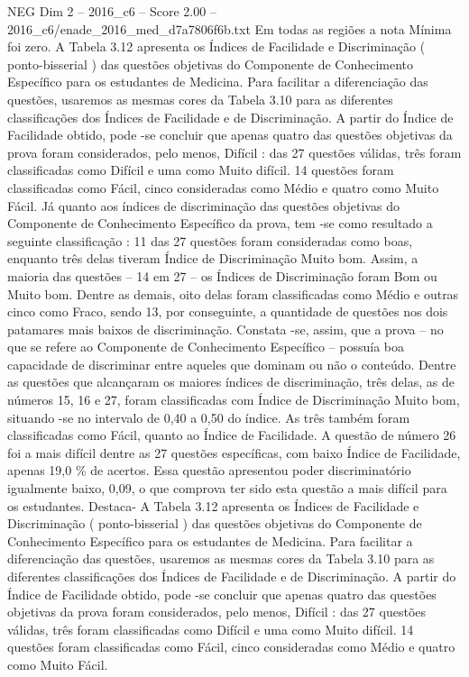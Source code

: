 \begin{textsample}{NEG Dim 2 – 2016\_c6 – Score 2.00 – 2016\_c6/enade\_2016\_med\_d7a7806f6b.txt}
Em todas as regiões a nota Mínima foi zero.
A Tabela 3.12 apresenta os Índices de Facilidade e Discriminação ( ponto-bisserial ) das questões objetivas do Componente de Conhecimento Específico para os estudantes de Medicina.
Para facilitar a diferenciação das questões, usaremos as mesmas cores da Tabela 3.10 para as diferentes classificações dos Índices de Facilidade e de Discriminação.
A partir do Índice de Facilidade obtido, pode -se concluir que apenas quatro das questões objetivas da prova foram considerados, pelo menos, Difícil : das 27 questões válidas, três foram classificadas como Difícil e uma como Muito difícil. 14 questões foram classificadas como Fácil, cinco consideradas como Médio e quatro como Muito Fácil.
Já quanto aos índices de discriminação das questões objetivas do Componente de Conhecimento Específico da prova, tem -se como resultado a seguinte classificação : 11 das 27 questões foram consideradas como boas, enquanto três delas tiveram Índice de Discriminação Muito bom.
Assim, a maioria das questões – 14 em 27 – os Índices de Discriminação foram Bom ou Muito bom.
Dentre as demais, oito delas foram classificadas como Médio e outras cinco como Fraco, sendo 13, por conseguinte, a quantidade de questões nos dois patamares mais baixos de discriminação.
Constata -se, assim, que a prova – no que se refere ao Componente de Conhecimento Específico – possuía boa capacidade de discriminar entre aqueles que dominam ou não o conteúdo.
Dentre as questões que alcançaram os maiores índices de discriminação, três delas, as de números 15, 16 e 27, foram classificadas com Índice de Discriminação Muito bom, situando -se no intervalo de 0,40 a 0,50 do índice.
As três também foram classificadas como Fácil, quanto ao Índice de Facilidade.
A questão de número 26 foi a mais difícil dentre as 27 questões específicas, com baixo Índice de Facilidade, apenas 19,0 \% de acertos.
Essa questão apresentou poder discriminatório igualmente baixo, 0,09, o que comprova ter sido esta questão a mais difícil para os estudantes.
Destaca- A Tabela 3.12 apresenta os Índices de Facilidade e Discriminação ( ponto-bisserial ) das questões objetivas do Componente de Conhecimento Específico para os estudantes de Medicina.
Para facilitar a diferenciação das questões, usaremos as mesmas cores da Tabela 3.10 para as diferentes classificações dos Índices de Facilidade e de Discriminação.
A partir do Índice de Facilidade obtido, pode -se concluir que apenas quatro das questões objetivas da prova foram considerados, pelo menos, Difícil : das 27 questões válidas, três foram classificadas como Difícil e uma como Muito difícil. 14 questões foram classificadas como Fácil, cinco consideradas como Médio e quatro como Muito Fácil.

\end{textsample}
